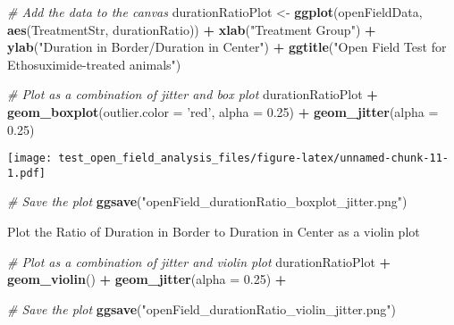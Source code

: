 \documentclass[]{article}
\newenvironment{Shaded}{\begin{snugshade}}{\end{snugshade}}
\newcommand{\KeywordTok}[1]{\textcolor[rgb]{0.13,0.29,0.53}{\textbf{#1}}}
\newcommand{\DataTypeTok}[1]{\textcolor[rgb]{0.13,0.29,0.53}{#1}}
\newcommand{\FloatTok}[1]{\textcolor[rgb]{0.00,0.00,0.81}{#1}}
\newcommand{\StringTok}[1]{\textcolor[rgb]{0.31,0.60,0.02}{#1}}
\newcommand{\CommentTok}[1]{\textcolor[rgb]{0.56,0.35,0.01}{\textit{#1}}}
\newcommand{\OperatorTok}[1]{\textcolor[rgb]{0.81,0.36,0.00}{\textbf{#1}}}
\newcommand{\NormalTok}[1]{#1}
\begin{document}
\begin{Shaded}
\begin{Highlighting}[]
\CommentTok{# Add the data to the canvas}
\NormalTok{durationRatioPlot <-}\StringTok{ }\KeywordTok{ggplot}\NormalTok{(openFieldData, }\KeywordTok{aes}\NormalTok{(TreatmentStr, durationRatio)) }\OperatorTok{+}
\StringTok{    }\KeywordTok{xlab}\NormalTok{(}\StringTok{"Treatment Group"}\NormalTok{) }\OperatorTok{+}\StringTok{ }\KeywordTok{ylab}\NormalTok{(}\StringTok{"Duration in Border/Duration in Center"}\NormalTok{) }\OperatorTok{+}
\StringTok{    }\KeywordTok{ggtitle}\NormalTok{(}\StringTok{"Open Field Test for Ethosuximide-treated animals"}\NormalTok{)}

\CommentTok{# Plot as a combination of jitter and box plot}
\NormalTok{durationRatioPlot }\OperatorTok{+}\StringTok{ }\KeywordTok{geom_boxplot}\NormalTok{(}\DataTypeTok{outlier.color =} \StringTok{'red'}\NormalTok{, }\DataTypeTok{alpha =} \FloatTok{0.25}\NormalTok{) }\OperatorTok{+}
\StringTok{    }\KeywordTok{geom_jitter}\NormalTok{(}\DataTypeTok{alpha =} \FloatTok{0.25}\NormalTok{)}
\end{Highlighting}
\end{Shaded}

\texttt{[image: test\_open\_field\_analysis\_files/figure-latex/unnamed-chunk-11-1.pdf]}

\begin{Shaded}
\begin{Highlighting}[]
\CommentTok{# Save the plot}
\KeywordTok{ggsave}\NormalTok{(}\StringTok{"openField_durationRatio_boxplot_jitter.png"}\NormalTok{)}
\end{Highlighting}
\end{Shaded}

Plot the Ratio of Duration in Border to Duration in Center as a violin
plot

\begin{Shaded}
\begin{Highlighting}[]
\CommentTok{# Plot as a combination of jitter and violin plot}
\NormalTok{durationRatioPlot }\OperatorTok{+}\StringTok{ }\KeywordTok{geom_violin}\NormalTok{() }\OperatorTok{+}
\StringTok{    }\KeywordTok{geom_jitter}\NormalTok{(}\DataTypeTok{alpha =} \FloatTok{0.25}\NormalTok{) }\OperatorTok{+}

\CommentTok{# Save the plot}
\KeywordTok{ggsave}\NormalTok{(}\StringTok{"openField_durationRatio_violin_jitter.png"}\NormalTok{)}
\end{Highlighting}
\end{Shaded}
\end{document}
